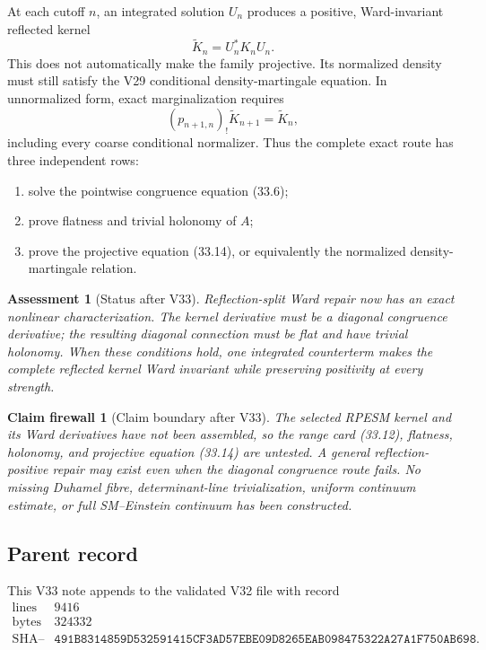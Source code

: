 \documentclass[11pt]{article}
\newtheorem{firewall}[theorem]{Claim firewall}
\newtheorem{assessment}[theorem]{Assessment}
\theoremstyle{remark}
\begin{document}
At each cutoff \(n\), an integrated solution \(U_n\) produces a
positive, Ward-invariant reflected kernel
\[
                         \widetilde K_n=U_n^*K_nU_n.
\]
This does not automatically make the family projective.  Its
normalized density must still satisfy the V29 conditional
density-martingale equation.  In unnormalized form, exact
marginalization requires
\begin{equation}
 (p_{n+1,n})_!\widetilde K_{n+1}
 =
 \widetilde K_n,                                  \tag{33.14}
\end{equation}
including every coarse conditional normalizer.  Thus the complete
exact route has three independent rows:
\begin{enumerate}
\item solve the pointwise congruence equation (33.6);
\item prove flatness and trivial holonomy of \(A\);
\item prove the projective equation (33.14), or equivalently the
normalized density-martingale relation.
\end{enumerate}

\begin{assessment}[Status after V33]
\label{ass:v12v33-status}
Reflection-split Ward repair now has an exact nonlinear
characterization.  The kernel derivative must be a diagonal
congruence derivative; the resulting diagonal connection must be
flat and have trivial holonomy.  When these conditions hold, one
integrated counterterm makes the complete reflected kernel Ward
invariant while preserving positivity at every strength.
\end{assessment}

\begin{firewall}[Claim boundary after V33]
\label{fire:v12v33-claim}
The selected RPESM kernel and its Ward derivatives have not been
assembled, so the range card (33.12), flatness, holonomy, and
projective equation (33.14) are untested.  A general
reflection-positive repair may exist even when the diagonal
congruence route fails.  No missing Duhamel fibre, determinant-line
trivialization, uniform continuum estimate, or full SM--Einstein
continuum has been constructed.
\end{firewall}

\subsection{Parent record}

This V33 note appends to the validated V32 file with record
\[
\begin{array}{c|c}
\text{lines}&9416\\
\text{bytes}&324332\\
\text{SHA--256}&
\texttt{491B8314859D532591415CF3AD57EBE09D8265EAB098475322A27A1F750AB698}.
\end{array}
\]
\end{document}
